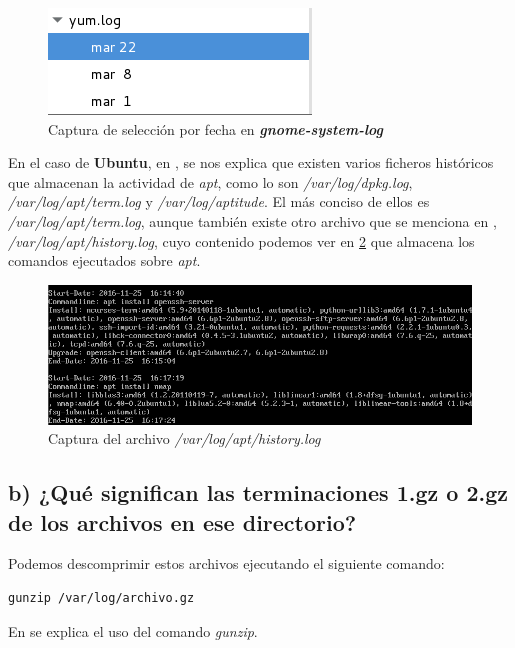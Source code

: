 \begin{figure}[H]
	\centering
	\includegraphics[scale=0.6]{cuestion1-gnomesyslog2.png}
	\caption{Captura de selección por fecha en \textbf{\textit{gnome-system-log}}} \label{gnome-system-log2}
\end{figure}

En el caso de \textbf{Ubuntu}, en \cite{debian}, se nos explica que existen varios ficheros históricos que almacenan la actividad de \textit{apt}, como lo son \textit{/var/log/dpkg.log}, \textit{/var/log/apt/term.log} y \textit{/var/log/aptitude}. El más conciso de ellos es \textit{/var/log/apt/term.log}, aunque también existe otro archivo que se menciona en \cite{ubuntubook}, \textit{/var/log/apt/history.log}, cuyo contenido podemos ver en \ref{historylog} que almacena los comandos ejecutados sobre \textit{apt}.

\begin{figure}[H]
	\centering
	\includegraphics[scale=0.6]{cuestion1-historylog.png}
	\caption{Captura del archivo \textit{/var/log/apt/history.log}} \label{historylog}
\end{figure}

\subsection{b) ¿Qué significan las terminaciones 1.gz o 2.gz de los archivos en ese directorio?}

Podemos descomprimir estos archivos ejecutando el siguiente comando:
\begin{verbatim}
gunzip /var/log/archivo.gz
\end{verbatim}

En \cite{gunzip} se explica el uso del comando \textit{gunzip}.

